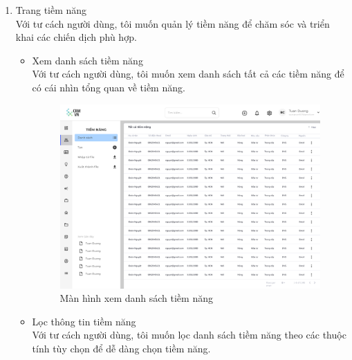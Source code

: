 \documentclass[12pt,a4paper]{article}
\begin{document}
\begin{enumerate}
        \item Trang tiềm năng \\
        Với tư cách người dùng, tôi muốn quản lý tiềm năng để chăm sóc và triển khai các chiến dịch phù hợp.
        \begin{itemize}
            \item Xem danh sách tiềm năng \\
            Với tư cách người dùng, tôi muốn xem danh sách tất cả các tiềm năng để có cái nhìn tổng quan về tiềm năng.
            \begin{figure}[H]
                \centering \includegraphics[width=\textwidth]{Img/Nguyet/dstiemnang.png}
                \vspace{0.5cm}
                \caption{Màn hình xem danh sách tiềm năng}
                \label{dstiemnang}
            \end{figure}
            \item Lọc thông tin tiềm năng \\
            Với tư cách người dùng, tôi muốn lọc danh sách tiềm năng theo các thuộc tính tùy chọn để dễ dàng chọn tiềm năng.


\end{itemize}
\end{enumerate}
\end{document}
